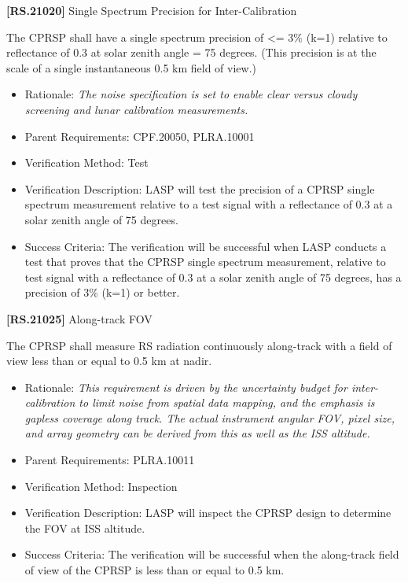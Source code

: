 \textbf{[RS.21020]} Single Spectrum Precision for Inter-Calibration

The \gls{CPRSP} shall have a single spectrum precision of <= 3\% (k=1) relative to reflectance of 0.3 at solar zenith angle = 75 degrees. (This precision is at the scale of a single instantaneous 0.5 km field of view.)

\begin{itemize}
\item{} Rationale: \emph{The noise specification is set to enable clear versus cloudy screening and lunar calibration measurements.}

\item{} Parent Requirements: \gls{CPF}.20050, PLRA.10001

\item{} Verification Method: Test

\item{} Verification Description: \gls{LASP} will \gls{test} the precision of a \gls{CPRSP} single spectrum \gls{measure}ment relative to a \gls{test} signal with a reflectance of 0.3 at a solar zenith angle of 75 degrees.

\item{} Success Criteria: The verification will be successful when \gls{LASP} conducts a \gls{test} that proves that the \gls{CPRSP} single spectrum \gls{measure}ment, relative to \gls{test} signal with a reflectance of 0.3 at a solar zenith angle of 75 degrees, has a precision of 3\% (k=1) or better.

\end{itemize}

\textbf{[RS.21025]} Along-track \gls{FOV}

The \gls{CPRSP} shall \gls{measure} \gls{RS} radiation continuously along-track with a field of view less than or equal to 0.5 km at nadir.

\begin{itemize}
\item{} Rationale: \emph{This requirement is driven by the uncertainty budget for inter-calibration to limit noise from spatial data mapping, and the emphasis is gapless coverage along track. The actual instrument angular FOV, pixel size, and array geometry can be derived from this as well as the ISS altitude.}

\item{} Parent Requirements: PLRA.10011

\item{} Verification Method: Inspection

\item{} Verification Description: \gls{LASP} will inspect the \gls{CPRSP} design to determine the \gls{FOV} at \gls{ISS} altitude.

\item{} Success Criteria: The verification will be successful when the along-track field of view of the \gls{CPRSP} is less than or equal to 0.5 km.

\end{itemize}

